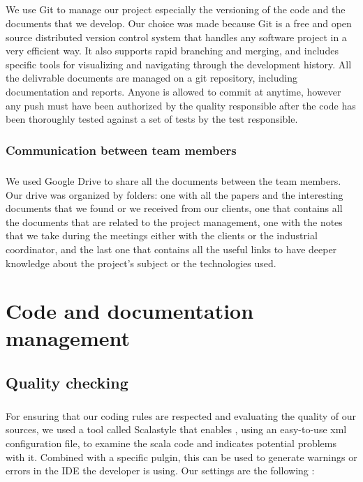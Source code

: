 \documentclass{report}
\begin{document}
\paragraph{}
\hspace{4mm}\textnormal{We use Git to manage our project especially the versioning of the code
and the documents that we develop. Our choice was made 
because Git is a free and open source
 distributed version control system that handles any software 
project in a very efficient way. It also supports rapid branching and merging, 
and includes specific tools for visualizing and 
navigating through the development history.
All the delivrable documents are managed on a git repository, including documentation and reports. Anyone is allowed to commit at anytime, however any push must have been authorized by the quality responsible after the code has been thoroughly tested against a set of tests by the test responsible.}

\subsection{Communication between team members}

\paragraph{}
\hspace{4mm}\textnormal{We used Google Drive to share all the documents 
between the team members. Our drive was organized by folders: 
one with all the papers and the interesting documents
 that we found or we received from our clients,
one that contains all the documents that are related 
to the project management,
one with the notes that we take during the meetings either with 
the clients or the industrial coordinator,  
and the last one that contains all the useful links to have deeper
knowledge about the project's subject or the technologies used.}

\chapter{Code and documentation management}

\section{Quality checking}

\paragraph{}
\hspace{4mm}\textnormal{For ensuring that our coding rules are respected and
 evaluating the quality of our sources,
 we used a tool called Scalastyle that enables
, using an easy-to-use xml configuration file,
 to examine the scala code and indicates potential problems with it.
 Combined with a specific pulgin, this can be used to generate 
warnings or errors in the IDE the developer is using. 
Our settings are the following :}
\end{document}
